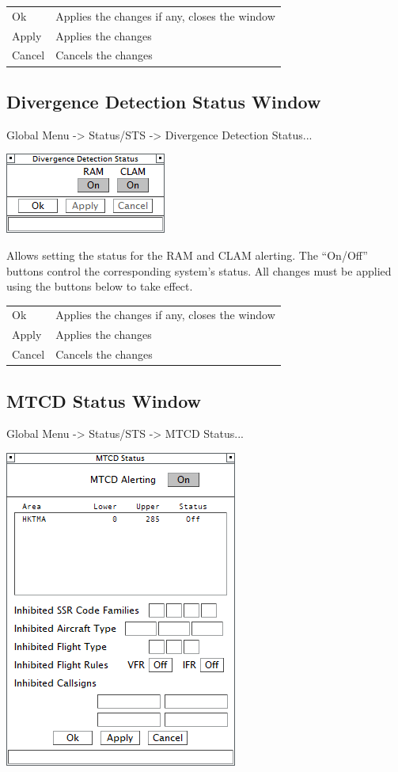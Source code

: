 \documentclass[11pt,a4paper,oldfontcommands]{memoir}
\begin{document}
\begin{tabular}{l l}
    Ok      & Applies the changes if any, closes the window\\
    Apply   & Applies the changes\\
    Cancel  & Cancels the changes\\
\end{tabular}

\subsection{Divergence Detection Status Window}
\label{win:ddsw}

Global Menu -> Status/STS -> Divergence Detection Status...

\includegraphics{img/divsts.png}

Allows setting the status for the RAM and CLAM alerting. The “On/Off” buttons control the corresponding system’s status. All changes must be applied using the buttons below to take effect.

\begin{tabular}{l l}
    Ok      & Applies the changes if any, closes the window\\
    Apply   & Applies the changes\\
    Cancel  & Cancels the changes\\
\end{tabular}

\subsection{MTCD Status Window}
\label{win:mtcdsw}

Global Menu -> Status/STS -> MTCD Status...

\includegraphics{img/mtcd.png}
\end{document}
